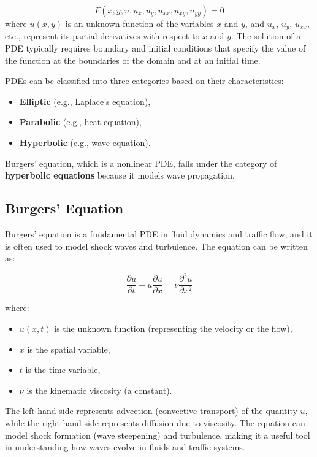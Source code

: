 \documentclass[conference]{IEEEtran}
\begin{document}
\[
F(x, y, u, u_x, u_y, u_{xx}, u_{xy}, u_{yy}) = 0
\]
where \(u(x, y)\) is an unknown function of the variables \(x\) and \(y\), and \(u_x\), \(u_y\), \(u_{xx}\), etc., represent its partial derivatives with respect to \(x\) and \(y\). The solution of a PDE typically requires boundary and initial conditions that specify the value of the function at the boundaries of the domain and at an initial time.

PDEs can be classified into three categories based on their characteristics:
\begin{itemize}
    \item \textbf{Elliptic} (e.g., Laplace's equation),
    \item \textbf{Parabolic} (e.g., heat equation),
    \item \textbf{Hyperbolic} (e.g., wave equation).
\end{itemize}

Burgers' equation, which is a nonlinear PDE, falls under the category of \textbf{hyperbolic equations} because it models wave propagation.

\subsection{Burgers' Equation}

Burgers' equation is a fundamental PDE in fluid dynamics and traffic flow, and it is often used to model shock waves and turbulence. The equation can be written as:

\[
\frac{\partial u}{\partial t} + u \frac{\partial u}{\partial x} = \nu \frac{\partial^2 u}{\partial x^2}
\]

where:
\begin{itemize}
    \item \(u(x,t)\) is the unknown function (representing the velocity or the flow),
    \item \(x\) is the spatial variable,
    \item \(t\) is the time variable,
    \item \(\nu\) is the kinematic viscosity (a constant).
\end{itemize}

The left-hand side represents advection (convective transport) of the quantity \(u\), while the right-hand side represents diffusion due to viscosity. The equation can model shock formation (wave steepening) and turbulence, making it a useful tool in understanding how waves evolve in fluids and traffic systems.
\end{document}
